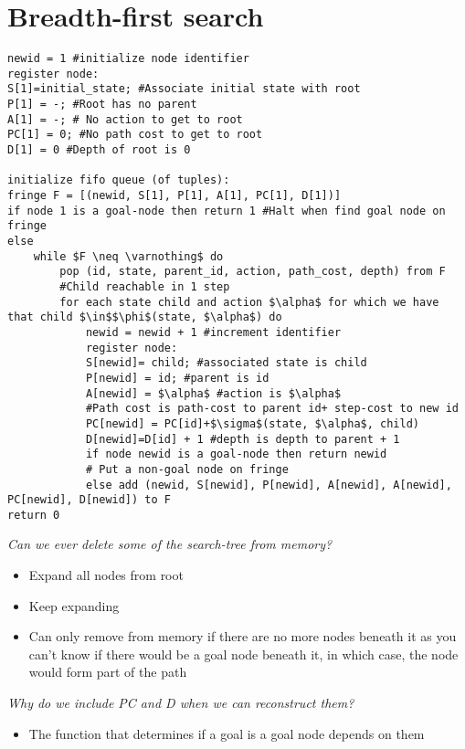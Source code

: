\documentclass{article}[18pt]
\begin{document}
\section{Breadth-first search}
\begin{lstlisting}[mathescape=true,tabsize=2]
newid = 1 #initialize node identifier
register node:
S[1]=initial_state; #Associate initial state with root
P[1] = -; #Root has no parent
A[1] = -; # No action to get to root
PC[1] = 0; #No path cost to get to root
D[1] = 0 #Depth of root is 0

initialize fifo queue (of tuples):
fringe F = [(newid, S[1], P[1], A[1], PC[1], D[1])]
if node 1 is a goal-node then return 1 #Halt when find goal node on fringe
else
	while $F \neq \varnothing$ do
		pop (id, state, parent_id, action, path_cost, depth) from F
		#Child reachable in 1 step
		for each state child and action $\alpha$ for which we have that child $\in$$\phi$(state, $\alpha$) do
			newid = newid + 1 #increment identifier
			register node: 
			S[newid]= child; #associated state is child
			P[newid] = id; #parent is id
			A[newid] = $\alpha$ #action is $\alpha$
			#Path cost is path-cost to parent id+ step-cost to new id
			PC[newid] = PC[id]+$\sigma$(state, $\alpha$, child) 
			D[newid]=D[id] + 1 #depth is depth to parent + 1
			if node newid is a goal-node then return newid
			# Put a non-goal node on fringe
			else add (newid, S[newid], P[newid], A[newid], A[newid], PC[newid], D[newid]) to F
return 0
\end{lstlisting}
\textit{Can we ever delete some of the search-tree from memory?}
\begin{itemize}
	\item Expand all nodes from root
	\item Keep expanding
	\item Can only remove from memory if there are no more nodes beneath it as you can't know if there would be a goal node beneath it, in which case, the node would form part of the path
\end{itemize}
\textit{Why do we include PC and D when we can reconstruct them?}
\begin{itemize}
	\item The function that determines if a goal is a goal node depends on them
\end{itemize}
\end{document}
